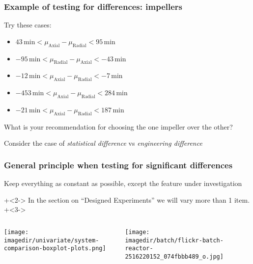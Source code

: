 \begin{frame}\frametitle{Example of testing for differences: impellers}

	
	\vspace{-6pt}
	Try these cases:
	
	\begin{itemize}
		\item	$43 \,\text{min} < \mu_\text{Axial} - \mu_\text{Radial} < 95\, \text{min} $
		\item	$-95 \,\text{min} < \mu_\text{Radial} - \mu_\text{Axial} < -43\, \text{min} $
		\item	$-12 \,\text{min} < \mu_\text{Axial} - \mu_\text{Radial} < -7\, \text{min} $
		\item	$-453 \,\text{min} < \mu_\text{Axial} - \mu_\text{Radial} < 284\, \text{min} $
		\item	$-21 \,\text{min} < \mu_\text{Axial} - \mu_\text{Radial} < 187\, \text{min} $
	\end{itemize}

\vspace{24pt}
	What is your recommendation for choosing the one impeller over the other?
	
	\vspace{12pt}

	Consider the case of \emph{statistical difference} vs \emph{engineering difference}
\end{frame}

\begin{frame}\frametitle{General principle when testing for significant differences}
	\begin{exampleblock}{}
		Keep everything as constant as possible, except the feature under investigation
	\end{exampleblock}
	
	\onslide+<2->{
		\vspace{12pt}
		In the section on ``Designed Experiments'' we will vary more than 1 item.
	}
	\onslide+<3->{
		\begin{columns}[T]
				\texttt{[image: \\imagedir/univariate/system-comparison-boxplot-plots.png]}
				
				\centerline{\texttt{[image: \\imagedir/batch/flickr-batch-reactor-2516220152\_074fbbb489\_o.jpg]} }

		\end{columns}
	}
	
	
\end{frame}

